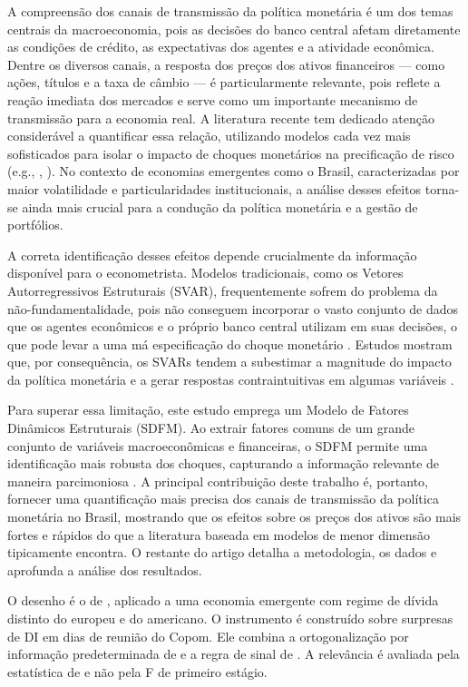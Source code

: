 \documentclass[
article,			%
12pt,				%
oneside,			%
a4paper,			%
hidelinks, 
english,			%
brazil,				%
]{abntex2}
\theoremstyle{plain}
\theoremstyle{definition}
\theoremstyle{remark}
\begin{document}
A compreensão dos canais de transmissão da política monetária é um dos temas centrais da macroeconomia, pois as decisões do banco central afetam diretamente as condições de crédito, as expectativas dos agentes e a atividade econômica. Dentre os diversos canais, a resposta dos preços dos ativos financeiros — como ações, títulos e a taxa de câmbio — é particularmente relevante, pois reflete a reação imediata dos mercados e serve como um importante mecanismo de transmissão para a economia real. A literatura recente tem dedicado atenção considerável a quantificar essa relação, utilizando modelos cada vez mais sofisticados para isolar o impacto de choques monetários na precificação de risco (e.g., , ). No contexto de economias emergentes como o Brasil, caracterizadas por maior volatilidade e particularidades institucionais, a análise desses efeitos torna-se ainda mais crucial para a condução da política monetária e a gestão de portfólios.

A correta identificação desses efeitos depende crucialmente da informação disponível para o econometrista. Modelos tradicionais, como os Vetores Autorregressivos Estruturais (SVAR), frequentemente sofrem do problema da não-fundamentalidade, pois não conseguem incorporar o vasto conjunto de dados que os agentes econômicos e o próprio banco central utilizam em suas decisões, o que pode levar a uma má especificação do choque monetário \cite{villaverde}. Estudos mostram que, por consequência, os SVARs tendem a subestimar a magnitude do impacto da política monetária e a gerar respostas contraintuitivas em algumas variáveis \cite{alessi}.

Para superar essa limitação, este estudo emprega um Modelo de Fatores Dinâmicos Estruturais (SDFM). Ao extrair fatores comuns de um grande conjunto de variáveis macroeconômicas e financeiras, o SDFM permite uma identificação mais robusta dos choques, capturando a informação relevante de maneira parcimoniosa \cite{STOCK2016415}. A principal contribuição deste trabalho é, portanto, fornecer uma quantificação mais precisa dos canais de transmissão da política monetária no Brasil, mostrando que os efeitos sobre os preços dos ativos são mais fortes e rápidos do que a literatura baseada em modelos de menor dimensão tipicamente encontra. O restante do artigo detalha a metodologia, os dados e aprofunda a análise dos resultados.

O desenho é o de , aplicado a uma economia emergente com regime de dívida distinto do europeu e do americano. O instrumento é construído sobre surpresas de DI em dias de reunião do Copom. Ele combina a ortogonalização por informação predeterminada de  e a regra de sinal de . A relevância é avaliada pela estatística de  e não pela F de primeiro estágio.
\end{document}
